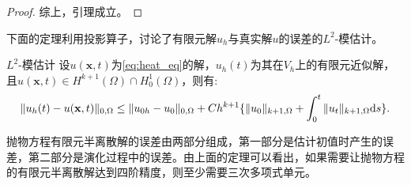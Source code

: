 \begin{proof}
    综上，引理成立。
\end{proof}
下面的定理利用投影算子，讨论了有限元解$u_{h}$与真实解$u$的误差的$L^{2}$-模估计。
\begin{theorem}{$L^{2}$-模估计}
    设$u(\mathbf{x},t)$为\eqref{eq:heat_eq}的解，$u_{h}(t)$为其在$V_{h}$上的有限元近似解，且$u(\mathbf{x},t)\in H^{k+1}(\Omega)\cap H_{0}^{1}(\Omega)$，则有:
    \begin{equation}
        \|u_{h}(t)-u(\mathbf{x},t)\|_{0,\Omega}\le \|u_{0h}-u_{0}\|_{0,\Omega}+Ch^{k+1}\{\|u_{0}\|_{k+1,\Omega}+\int_{0}^{t}\|u_{t}\|_{k+1,\Omega}\mathrm{d} s\}.
    \end{equation}
\end{theorem}
\begin{remark}
    抛物方程有限元半离散解的误差由两部分组成，第一部分是估计初值时产生的误差，第二部分是演化过程中的误差。由上面的定理可以看出，如果需要让抛物方程的有限元半离散解达到四阶精度，则至少需要三次多项式单元。
\end{remark}
